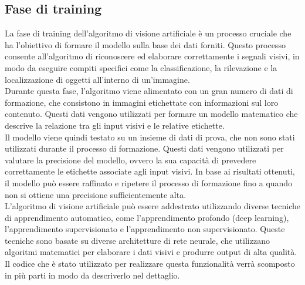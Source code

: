 \documentclass[a4paper,final,12pt]{report}
\begin{document}
\subsection{Fase di training}
La fase di training dell'algoritmo di visione artificiale è un processo cruciale che ha l'obiettivo di formare il modello sulla base dei dati forniti. Questo processo consente all'algoritmo di riconoscere ed elaborare correttamente i segnali visivi, in modo da eseguire compiti specifici come la classificazione, la rilevazione e la localizzazione di oggetti all'interno di un'immagine.\\
Durante questa fase, l'algoritmo viene alimentato con un gran numero di dati di formazione, che consistono in immagini etichettate con informazioni sul loro contenuto. Questi dati vengono utilizzati per formare un modello matematico che descrive la relazione tra gli input visivi e le relative etichette.\\
Il modello viene quindi testato su un insieme di dati di prova, che non sono stati utilizzati durante il processo di formazione. Questi dati vengono utilizzati per valutare la precisione del modello, ovvero la sua capacità di prevedere correttamente le etichette associate agli input visivi. In base ai risultati ottenuti, il modello può essere raffinato e ripetere il processo di formazione fino a quando non si ottiene una precisione sufficientemente alta.\\
L'algoritmo di visione artificiale può essere addestrato utilizzando diverse tecniche di apprendimento automatico, come l'apprendimento profondo (deep learning), l'apprendimento supervisionato e l'apprendimento non supervisionato. Queste tecniche sono basate su diverse architetture di rete neurale, che utilizzano algoritmi matematici per elaborare i dati visivi e produrre output di alta qualità.\\
Il codice che è stato utilizzato per realizzare questa funzionalità verrà scomposto in più parti in modo da descriverlo nel dettaglio.
\newpage
\end{document}
